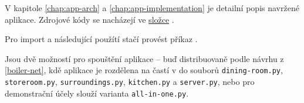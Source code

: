V kapitole \ref{chap:app-arch} a \ref{chap:app-implementation} je detailní popis navržené aplikace. Zdrojové kódy se nacházejí ve \href{https://github.com/Danil-Grigorev/rt-sim-petry-net/tree/master/sample_nets}{složce} .

Pro import a následující použítí stačí provést příkaz .

Jsou dvě možností pro spouštění aplikace -- buď distribuovaně podle návrhu z \ref{boiler-net}, kdě aplikace je rozdělena na častí v do souborů \texttt{dining-room.py}, \texttt{storeroom.py}, \texttt{surroundings.py}, \texttt{kitchen.py} a \texttt{server.py}, nebo pro demonstrační účely slouží varianta \texttt{all-in-one.py}.
